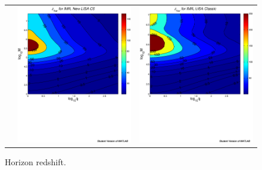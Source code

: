 \documentclass{iopart}
\begin{document}
\begin{figure}[htb]
\begin{center}
\begin{tabular}{ccc}
&\includegraphics[scale=0.33,clip=true]{FigEmanuele/C5IMRZhorContour.ps}
&\includegraphics[scale=0.33,clip=true]{FigEmanuele/IMRZhorContour.ps}\\
\end{tabular}
\caption{\label{fig:zhor} Horizon redshift.}
\end{center}
\end{figure}
%
\end{document}
